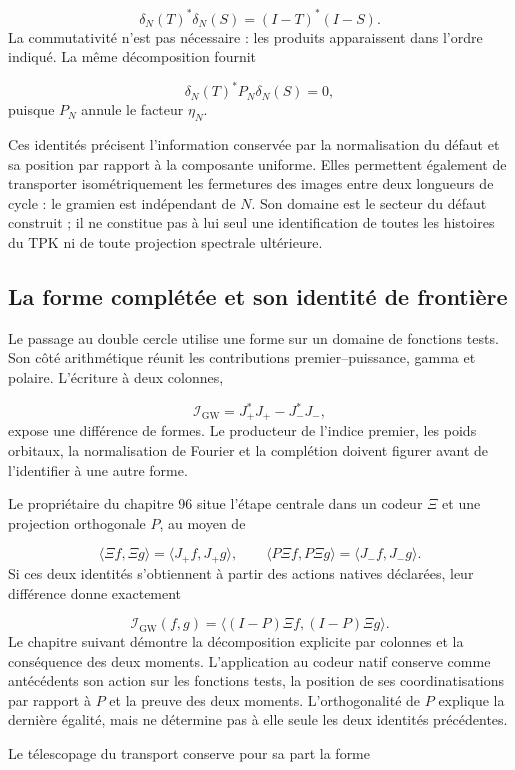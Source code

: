 \[
\delta_N(T)^*\delta_N(S)=(I-T)^*(I-S).
\]
La commutativité n'est pas nécessaire : les produits apparaissent dans l'ordre indiqué. La même décomposition fournit

\[
\delta_N(T)^*P_N\delta_N(S)=0,
\]
puisque \(P_N\) annule le facteur \(\eta_N\).

Ces identités précisent l’information conservée par la normalisation du défaut et sa position par rapport à la composante uniforme. Elles permettent également de transporter isométriquement les fermetures des images entre deux longueurs de cycle : le gramien est indépendant de \(N\). Son domaine est le secteur du défaut construit ; il ne constitue pas à lui seul une identification de toutes les histoires du TPK ni de toute projection spectrale ultérieure.

\subsection{La forme complétée et son identité de frontière}
Le passage au double cercle utilise une forme sur un domaine de fonctions tests. Son côté arithmétique réunit les contributions premier–puissance, gamma et polaire. L'écriture à deux colonnes,

\[
\mathscr I_{\mathrm{GW}}=J_+^*J_+-J_-^*J_-,
\]
expose une différence de formes. Le producteur de l'indice premier, les poids orbitaux, la normalisation de Fourier et la complétion doivent figurer avant de l'identifier à une autre forme.

Le propriétaire du chapitre 96 situe l'étape centrale dans un codeur $\Xi$ et une projection orthogonale $P$, au moyen de

\[
\langle\Xi f,\Xi g\rangle=\langle J_+f,J_+g\rangle,
\qquad
\langle P\Xi f,P\Xi g\rangle=\langle J_-f,J_-g\rangle.
\]
Si ces deux identités s'obtiennent à partir des actions natives déclarées, leur différence donne exactement

\[
\mathscr I_{\mathrm{GW}}(f,g)
=\langle(I-P)\Xi f,(I-P)\Xi g\rangle.
\]
Le chapitre suivant démontre la décomposition explicite par colonnes et la conséquence des deux moments. L'application au codeur natif conserve comme antécédents son action sur les fonctions tests, la position de ses coordinatisations par rapport à $P$ et la preuve des deux moments. L'orthogonalité de $P$ explique la dernière égalité, mais ne détermine pas à elle seule les deux identités précédentes.

Le télescopage du transport conserve pour sa part la forme

